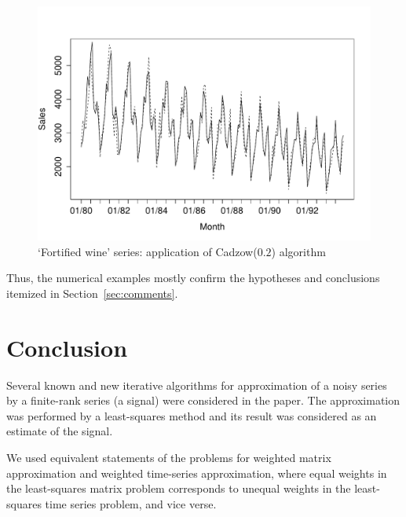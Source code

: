 \documentclass[sii]{ipart}
\begin{document}
\begin{figure}[!hhh]
	\includegraphics[width = \columnwidth]{rlimage.pdf}
	\caption{`Fortified wine' series: application of Cadzow($0.2$) algorithm}
	\label{fig:rl}
\end{figure}

Thus, the numerical examples mostly confirm the hypotheses and conclusions itemized in Section~\ref{sec:comments}.

\section{Conclusion}
\label{sec:concl}
%
%

Several known and new iterative algorithms for approximation of a noisy series by a finite-rank series (a signal) were considered in the paper. The approximation was performed by a least-squares method and its result was considered as an estimate of the signal.

 We used equivalent statements of the problems for weighted matrix approximation and  weighted time-series approximation, where equal weights in the least-squares matrix problem corresponds
 to unequal weights in the least-squares time series problem, and vice verse.
\end{document}
